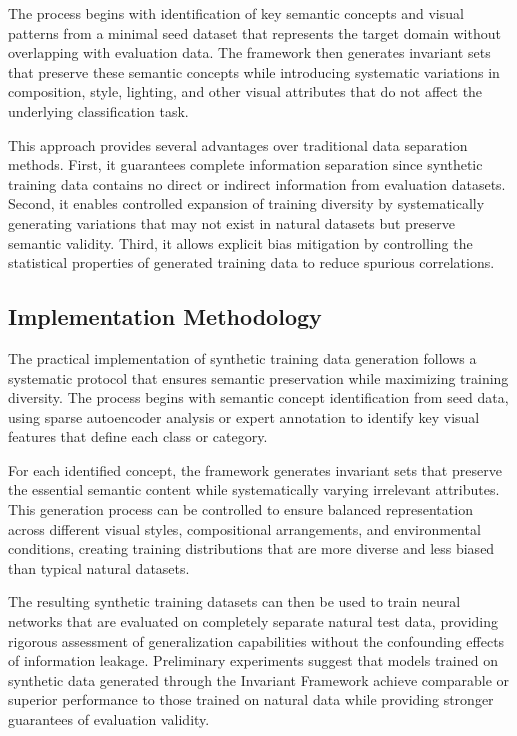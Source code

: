 The process begins with identification of key semantic concepts and visual patterns from a minimal seed dataset that represents the target domain without overlapping with evaluation data. The framework then generates invariant sets that preserve these semantic concepts while introducing systematic variations in composition, style, lighting, and other visual attributes that do not affect the underlying classification task.

This approach provides several advantages over traditional data separation methods. First, it guarantees complete information separation since synthetic training data contains no direct or indirect information from evaluation datasets. Second, it enables controlled expansion of training diversity by systematically generating variations that may not exist in natural datasets but preserve semantic validity. Third, it allows explicit bias mitigation by controlling the statistical properties of generated training data to reduce spurious correlations.

\subsection{Implementation Methodology}

The practical implementation of synthetic training data generation follows a systematic protocol that ensures semantic preservation while maximizing training diversity. The process begins with semantic concept identification from seed data, using sparse autoencoder analysis or expert annotation to identify key visual features that define each class or category.

For each identified concept, the framework generates invariant sets that preserve the essential semantic content while systematically varying irrelevant attributes. This generation process can be controlled to ensure balanced representation across different visual styles, compositional arrangements, and environmental conditions, creating training distributions that are more diverse and less biased than typical natural datasets.

The resulting synthetic training datasets can then be used to train neural networks that are evaluated on completely separate natural test data, providing rigorous assessment of generalization capabilities without the confounding effects of information leakage. Preliminary experiments suggest that models trained on synthetic data generated through the Invariant Framework achieve comparable or superior performance to those trained on natural data while providing stronger guarantees of evaluation validity.

